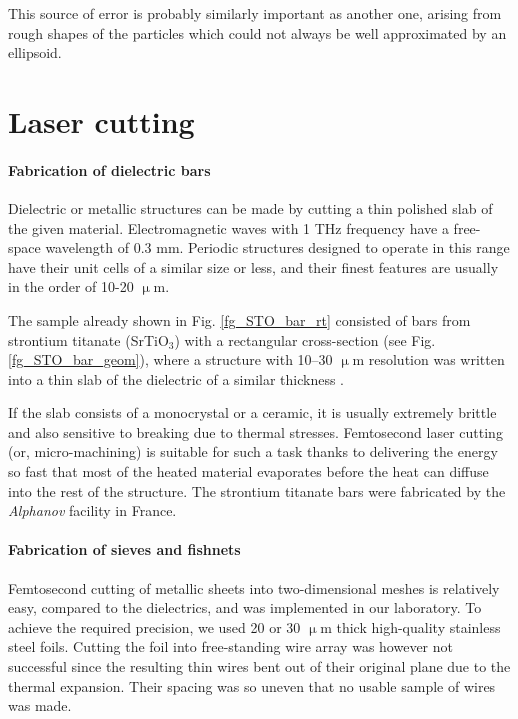 This source of error is probably similarly important as another one, arising from rough shapes of the particles which could not always be well approximated by an ellipsoid. 

\section{Laser cutting}
\paragraph{Fabrication of dielectric bars}%
Dielectric or metallic structures can be made by cutting a thin polished slab of the given material. Electromagnetic waves with 1 THz frequency have a free-space wavelength of 0.3 mm. Periodic structures designed to operate in this range have their unit cells of a similar size or less, and their finest features are usually in the order of 10-20 $\upmu$m. 

The sample already shown in Fig. \ref{fg_STO_bar_rt} consisted of bars from strontium titanate (SrTiO$_{3}$) with a rectangular cross-section (see Fig. \ref{fg_STO_bar_geom}), where a structure with 10--30 $\upmu$m resolution was written into a thin slab of the dielectric of a similar thickness \cite{yahiaoui2011tunable}.

If the slab consists of a monocrystal or a ceramic, it is usually extremely brittle and also sensitive to breaking due to thermal stresses. Femtosecond laser cutting (or, micro-machining) is suitable for such a task thanks to delivering the energy so fast that most of the heated material evaporates before the heat can diffuse into the rest of the structure. 
The strontium titanate bars were fabricated by the \textit{Alphanov} facility in France.

\paragraph{Fabrication of sieves and fishnets}%
Femtosecond cutting of metallic sheets into two-dimensional meshes is relatively easy,   
compared to the dielectrics, 
and was implemented in our laboratory. To achieve the required precision, we used 20 or 30 $\upmu$m thick high-quality stainless steel foils. Cutting the foil into free-standing wire array was however not successful since the resulting thin wires bent out of their original plane due to the thermal expansion. Their spacing was so uneven that no usable sample of wires was made.

